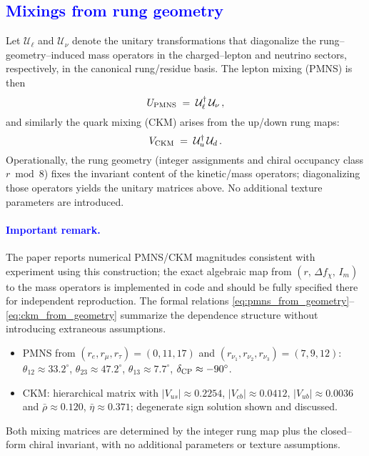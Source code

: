 \documentclass[%
 amsmath,amssymb,
 aps,
prb,
floatfix, showkeys
]{revtex4-2}
\newcommand{\modif}[1]{\textcolor{blue}{#1}}
\begin{document}
{\modif{
\subsection{Mixings from rung geometry}
\label{subsec:mixing}
}}
Let $\mathcal{U}_\ell$ and $\mathcal{U}_\nu$ denote the unitary transformations that diagonalize the rung--geometry--induced mass operators in the charged--lepton and neutrino sectors, respectively, in the canonical rung/residue basis. The lepton mixing (PMNS) is then
\begin{equation}
  U_{\rm PMNS} \;=\; \mathcal{U}_\ell^\dagger\,\mathcal{U}_\nu\,,
  \label{eq:pmns_from_geometry}
\end{equation}
and similarly the quark mixing (CKM) arises from the up/down rung maps:
\begin{equation}
  V_{\rm CKM} \;=\; \mathcal{U}_u^\dagger\,\mathcal{U}_d\,.
  \label{eq:ckm_from_geometry}
\end{equation}
Operationally, the rung geometry (integer assignments and chiral occupancy class $r\bmod 8$) fixes the invariant content of the kinetic/mass operators; diagonalizing those operators yields the unitary matrices above. No additional texture parameters are introduced.

\paragraph{ \modif{ Important remark.}}
The paper reports numerical PMNS/CKM magnitudes consistent with experiment using this construction; the exact algebraic map from $(r,\,\Delta f_\chi,\,I_m)$ to the mass operators is implemented in code and should be fully specified there for independent reproduction. The formal relations \eqref{eq:pmns_from_geometry}–\eqref{eq:ckm_from_geometry} summarize the dependence structure without introducing extraneous assumptions.

\begin{itemize}
  \item PMNS from $(r_e,r_\mu,r_\tau)=(0,11,17)$ and $(r_{\nu_1},r_{\nu_2},r_{\nu_3})=(7,9,12)$:
  $\theta_{12}\approx33.2^\circ$, $\theta_{23}\approx47.2^\circ$, $\theta_{13}\approx7.7^\circ$, $\delta_{\rm CP}\approx-90^\circ$.
  \item CKM: hierarchical matrix with $|V_{us}|\approx0.2254$, $|V_{cb}|\approx0.0412$, $|V_{ub}|\approx0.0036$ and $\bar\rho\approx0.120$, $\bar\eta\approx0.371$; degenerate sign solution shown and discussed.
\end{itemize}
Both mixing matrices are determined by the integer rung map plus the closed--form chiral invariant, with no additional parameters or texture assumptions.
\end{document}
